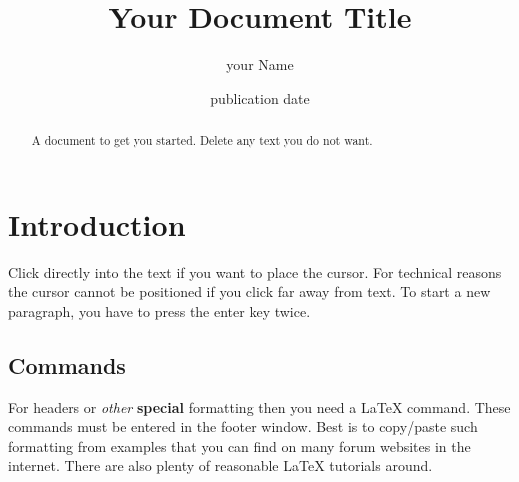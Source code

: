 \documentclass[a4paper, 11pt]{article}
\title{Your Document Title}
\author{your Name}
\date{publication date}
\begin{document}

\maketitle

\begin{abstract}
A document to get you started. Delete any text you do not want.
\end{abstract}

\section{Introduction}
Click directly into the text if you want to place the cursor. For technical reasons the cursor cannot be positioned if you click far away from text.  To start a new paragraph, you have to press the enter key twice.

\subsection{Commands}

For headers or \emph{other} \textbf{special} formatting then you need a  \LaTeX\xspace command. These commands must be entered in the footer window. Best is to copy/paste such formatting from examples that you can find on many forum websites in the internet. There are also plenty of reasonable  \LaTeX\xspace tutorials around.


\end{document}
